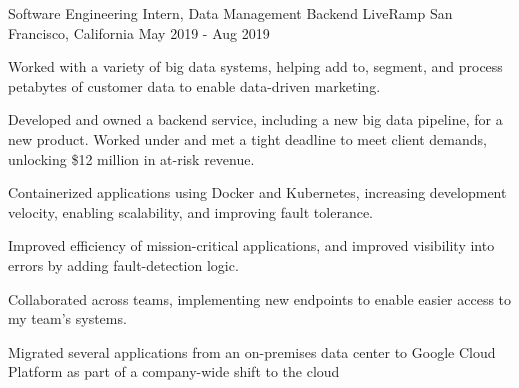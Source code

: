 

\begin{cventries}

    \cventry
      {Software Engineering Intern, Data Management Backend}
      {LiveRamp}
      {San Francisco, California}
      {May 2019 - Aug 2019}
      {
        \begin{cvitems}
          \item Worked with a variety of big data systems, helping add to, segment, and process petabytes of customer data to enable data-driven marketing.
          \item Developed and owned a backend service, including a new big data pipeline, for a new product. Worked under and met a tight deadline to meet client demands, unlocking \$12 million in at-risk revenue.
          \item Containerized applications using Docker and Kubernetes, increasing development velocity, enabling scalability, and improving fault tolerance.         
          \item Improved efficiency of mission-critical applications, and improved visibility into errors by adding fault-detection logic.
          \item Collaborated across teams, implementing new endpoints to enable easier access to my team's systems.
          \item Migrated several applications from an on-premises data center to Google Cloud Platform as part of a company-wide shift to the cloud
        \end{cvitems}
      }


\end{cventries}
